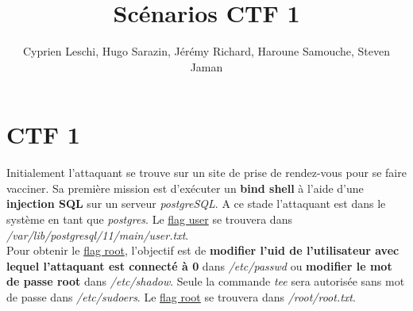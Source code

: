 \documentclass{article}
\title{Scénarios CTF 1}
\author{Cyprien Leschi, Hugo Sarazin, Jérémy Richard, Haroune Samouche, Steven Jaman}
\begin{document}
\maketitle

\section{CTF 1}

Initialement l'attaquant se trouve sur un site de prise de rendez-vous pour se faire vacciner. Sa première mission est d'exécuter un \textbf{bind shell} à l'aide d'une \textbf{injection SQL} sur un serveur \emph{postgreSQL}. A ce stade l'attaquant est dans le système en tant que \emph{postgres}. Le \underline{flag user} se trouvera dans \emph{/var/lib/postgresql/11/main/user.txt}.  \\

Pour obtenir le \underline{flag root}, l'objectif est de \textbf{modifier l'uid de l'utilisateur avec lequel l'attaquant est connecté à 0} dans \emph{/etc/passwd} ou \textbf{modifier le mot de passe root} dans \emph{/etc/shadow}. Seule la commande \emph{tee} sera autorisée sans mot de passe dans \emph{/etc/sudoers}. Le \underline{flag root} se trouvera dans \emph{/root/root.txt}.
\end{document}
